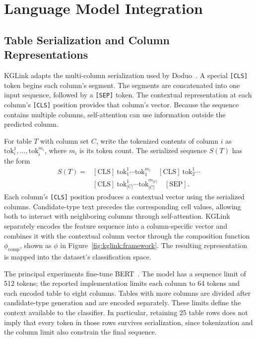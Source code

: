 \section{Language Model Integration}
\label{sec:kglink:language-model}

\subsection{Table Serialization and Column Representations}
\label{sec:kglink:serialization}

KGLink adapts the multi-column serialization used by Doduo~\cite{kglink-suhara2022annotating}. A special \texttt{[CLS]} token begins each column's segment. The segments are concatenated into one input sequence, followed by a \texttt{[SEP]} token. The contextual representation at each column's \texttt{[CLS]} position provides that column's vector. Because the sequence contains multiple columns, self-attention can use information outside the predicted column.

For table $T$ with column set $C$, write the tokenized contents of column $i$ as $\mathrm{tok}_i^1,\ldots,\mathrm{tok}_i^{m_i}$, where $m_i$ is its token count. The serialized sequence $S(T)$ has the form
\begin{equation}
\begin{split}
S(T)={}&[\mathrm{CLS}]\ \mathrm{tok}_1^1\cdots\mathrm{tok}_1^{m_1}\quad
[\mathrm{CLS}]\ \mathrm{tok}_2^1\cdots\\
&[\mathrm{CLS}]\ \mathrm{tok}_{|C|}^1\cdots\mathrm{tok}_{|C|}^{m_{|C|}}\quad
[\mathrm{SEP}].
\end{split}
\label{eq:kglink:serialization}
\end{equation}
Each column's \texttt{[CLS]} position produces a contextual vector using the serialized columns. Candidate-type text precedes the corresponding cell values, allowing both to interact with neighboring columns through self-attention. KGLink separately encodes the feature sequence into a column-specific vector and combines it with the contextual column vector through the composition function $\phi_{\mathrm{comp}}$, shown as $\phi$ in Figure~\ref{fig:kglink:framework}. The resulting representation is mapped into the dataset's classification space.

The principal experiments fine-tune BERT~\cite{kglink-devlin2018bert}. The model has a sequence limit of 512 tokens; the reported implementation limits each column to 64 tokens and each encoded table to eight columns. Tables with more columns are divided after candidate-type generation and are encoded separately. These limits define the context available to the classifier. In particular, retaining 25 table rows does not imply that every token in those rows survives serialization, since tokenization and the column limit also constrain the final sequence.

